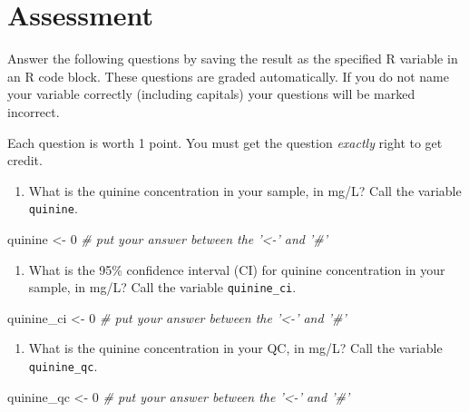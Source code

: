 \documentclass[]{tufte-book}
\newenvironment{Shaded}{}{}
\newcommand{\CommentTok}[1]{\textcolor[rgb]{0.38,0.63,0.69}{\textit{#1}}}
\newcommand{\DecValTok}[1]{\textcolor[rgb]{0.25,0.63,0.44}{#1}}
\newcommand{\NormalTok}[1]{#1}
\newcommand{\StringTok}[1]{\textcolor[rgb]{0.25,0.44,0.63}{#1}}
\providecommand{\tightlist}{%
  \setlength{\itemsep}{0pt}\setlength{\parskip}{0pt}}
\begin{document}
\hypertarget{uv-vis-assessment}{%
\section{Assessment}\label{uv-vis-assessment}}

Answer the following questions by saving the result as the specified R variable in an R code block. These questions are graded automatically. If you do not name your variable correctly (including capitals) your questions will be marked incorrect.

Each question is worth 1 point. You must get the question \emph{exactly} right to get credit.

\begin{enumerate}
\def\labelenumi{\arabic{enumi}.}
\tightlist
\item
  What is the quinine concentration in your sample, in mg/L? Call the variable \texttt{quinine}.
\end{enumerate}

\begin{Shaded}
\begin{Highlighting}[]
\NormalTok{quinine <-}\StringTok{ }\DecValTok{0}     \CommentTok{# put your answer between the '<-' and '#'}
\end{Highlighting}
\end{Shaded}

\begin{enumerate}
\def\labelenumi{\arabic{enumi}.}
\setcounter{enumi}{1}
\tightlist
\item
  What is the 95\% confidence interval (CI) for quinine concentration in your sample, in mg/L? Call the variable \texttt{quinine\_ci}.
\end{enumerate}

\begin{Shaded}
\begin{Highlighting}[]
\NormalTok{quinine_ci <-}\StringTok{ }\DecValTok{0}     \CommentTok{# put your answer between the '<-' and '#'}
\end{Highlighting}
\end{Shaded}

\begin{enumerate}
\def\labelenumi{\arabic{enumi}.}
\setcounter{enumi}{2}
\tightlist
\item
  What is the quinine concentration in your QC, in mg/L? Call the variable \texttt{quinine\_qc}.
\end{enumerate}

\begin{Shaded}
\begin{Highlighting}[]
\NormalTok{quinine_qc <-}\StringTok{ }\DecValTok{0}     \CommentTok{# put your answer between the '<-' and '#'}
\end{Highlighting}
\end{Shaded}
\end{document}
